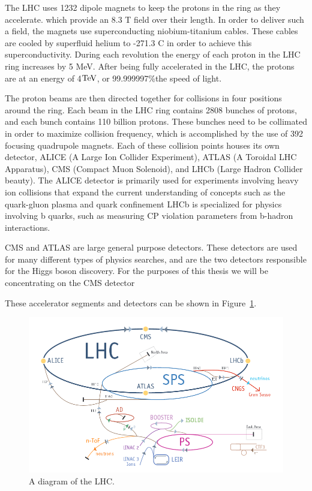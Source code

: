 The LHC uses 1232 dipole magnets to keep the protons in the ring as they accelerate. which provide an 8.3 T field over their length.  
In order to deliver such a field, the magnets use superconducting niobium-titanium cables.  
These cables are cooled by superfluid helium to -271.3 C in order to achieve this superconductivity.  
During each revolution the energy of each proton in the LHC ring increases by 5 MeV.  
After being fully accelerated in the LHC, the protons are at an energy of 4$\mathrm{TeV}$, or 99.999997\%the speed of light.

The proton beams are then directed together for collisions in four positions around the ring.  
Each beam in the LHC ring contains 2808 bunches of protons, and each bunch contains 110 billion protons. 
These bunches need to be collimated in order to maximize collision frequency, which is accomplished by the use of 392 focusing quadrupole magnets.   
Each of these collision points houses its own detector, ALICE (A Large Ion Collider Experiment), ATLAS (A Toroidal LHC Apparatus), 
CMS (Compact Muon Solenoid), and LHCb (Large Hadron Collider beauty).  
The ALICE detector is primarily used for experiments involving heavy ion collisions that expand the current 
understanding of concepts such as the quark-gluon plasma and quark confinement   
LHCb is specialized for physics involving b quarks, such as measuring CP violation parameters from b-hadron interactions.  

CMS and ATLAS are large general purpose detectors.  
These detectors are used for many different types of physics searches, and are the two detectors responsible for the Higgs boson discovery.  
For the purposes of this thesis we will be concentrating on the CMS detector
  
These accelerator segments and detectors can be shown in Figure~\ref{figs:lhc}.

\begin{figure}
\begin{center}
\includegraphics[width=1.0\linewidth]{figs/lhc.png}
\caption{A diagram of the LHC.}
\label{figs:lhc}
\end{center}
\end{figure}

